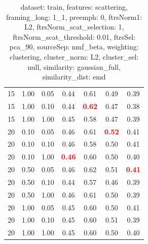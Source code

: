 \documentclass[12pt,a4paper,fleqn]{tufte-handout}
\begin{document}
\begin{table}
\begin{center}
\begin{tabular}{lllcccc}
15 & 1.00 & 0.05 & 0.44 & 0.61 & 0.49 & 0.39 \\        
15 & 1.00 & 0.10 & 0.44 & \textbf{\textcolor{red}{0.62}} & 0.47 & 0.38 \\        
15 & 1.00 & 1.00 & 0.45 & 0.58 & 0.47 & 0.39 \\        
20 & 0.10 & 0.05 & 0.46 & 0.61 & \textbf{\textcolor{red}{0.52}} & 0.41 \\        
20 & 0.10 & 0.10 & 0.46 & 0.58 & 0.50 & 0.41 \\        
20 & 0.10 & 1.00 & \textbf{\textcolor{red}{0.46}} & 0.60 & 0.50 & 0.40 \\        
20 & 0.50 & 0.05 & 0.46 & 0.62 & 0.51 & \textbf{\textcolor{red}{0.41}} \\        
20 & 0.50 & 0.10 & 0.44 & 0.57 & 0.46 & 0.39 \\        
20 & 0.50 & 1.00 & 0.46 & 0.61 & 0.50 & 0.39 \\        
20 & 1.00 & 0.05 & 0.45 & 0.60 & 0.50 & 0.41 \\        
20 & 1.00 & 0.10 & 0.45 & 0.60 & 0.51 & 0.39 \\        
20 & 1.00 & 1.00 & 0.45 & 0.60 & 0.50 & 0.40 \\        
\end{tabular}        
\end{center}        
\caption{dataset: train, features: scattering, framing\_long: 1\_1, preemph: 0, ftrsNorm1: L2, ftrsNorm\_scat\_selection: 1, ftrsNorm\_scat\_threshold: 0.01, ftrsSel: pca\_90, sourceSep: nmf\_beta, weighting: clustering, cluster\_norm: L2, cluster\_sel: null, similarity: gaussian\_full, similarity\_dist: emd}        
\label{datasetrFeaturscFraminlong1_1Preemp0Ftrsnorm1L2Ftrsnoscatselect1Ftrsnoscatthresh0.01Ftrsselpc90SourcesepnmbeWeightclClustenormL2ClusteselnuSimilagafuSimiladistem}        
\end{table}        
 
\end{document}
